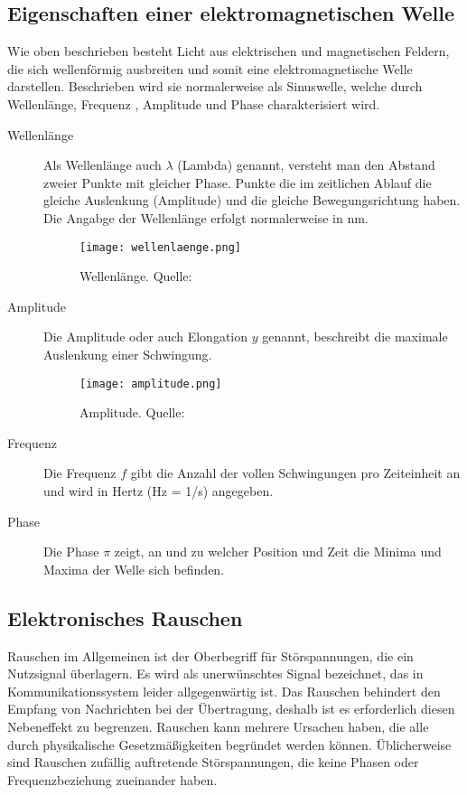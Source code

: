 \subsection{Eigenschaften einer elektromagnetischen Welle}
Wie oben beschrieben besteht Licht aus elektrischen und magnetischen Feldern, die sich wellenförmig ausbreiten und somit eine elektromagnetische Welle darstellen. Beschrieben wird sie normalerweise als Sinuswelle, welche durch Wellenlänge, Frequenz , Amplitude und Phase charakterisiert wird.
\begin{description}
	\item[Wellenlänge] Als Wellenlänge auch $\lambda$ (Lambda) genannt, versteht man den Abstand zweier Punkte mit gleicher Phase. Punkte die im zeitlichen Ablauf die gleiche Auslenkung (Amplitude) und die gleiche Bewegungsrichtung haben. Die Angabge der Wellenlänge erfolgt normalerweise in nm.
	\begin{figure}[ht]
		\centering
		\texttt{[image: wellenlaenge.png]}
		\caption[Wellenlänge]{Wellenlänge. Quelle: \cite{uniwien:2018}}
		\label{Wellenlänge}
	\end{figure}
	\item[Amplitude] Die Amplitude oder auch Elongation $y$ genannt, beschreibt die maximale Auslenkung einer Schwingung.
		\begin{figure}[ht]
		\centering
		\texttt{[image: amplitude.png]}
		\caption[Amplitude]{Amplitude. Quelle: \cite{uniwien:2018}}
			\label{Amplitude}
		\end{figure}
	\item[Frequenz]Die Frequenz $f$ gibt die Anzahl der vollen Schwingungen  pro Zeiteinheit an und wird in Hertz (Hz = 1/s) angegeben.
	\item[Phase] Die Phase $\pi$ zeigt, an und zu welcher Position und Zeit die Minima und Maxima der Welle sich befinden.
\end{description}

\subsection{Elektronisches Rauschen}
Rauschen im Allgemeinen ist der Oberbegriff für Störspannungen, die ein Nutzsignal überlagern. Es wird als unerwünschtes Signal bezeichnet, das in Kommunikationssystem leider allgegenwärtig ist. Das Rauschen behindert den Empfang von Nachrichten bei der Übertragung, deshalb ist es erforderlich diesen Nebeneffekt zu begrenzen. Rauschen kann mehrere Ursachen haben, die alle durch physikalische Gesetzmäßigkeiten begründet werden können. Üblicherweise sind  Rauschen zufällig auftretende Störspannungen, die keine  Phasen oder Frequenzbeziehung zueinander haben.






